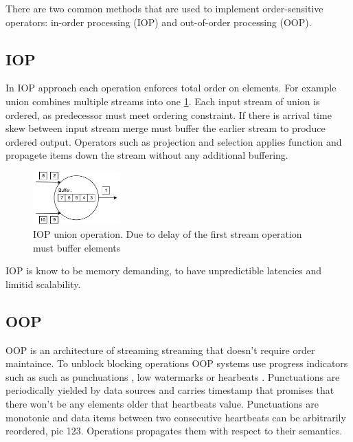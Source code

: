 
\label {fs-typical}

There are two common methods that are used to implement order-sensitive operators: in-order processing (IOP) \cite{Arasu:2006:CCQ:1146461.1146463} \cite{Cranor:2003:GSD:872757.872838} \cite{hammad2004optimizing} and out-of-order processing (OOP)\cite{Li:2008:OPN:1453856.1453890}.

\subsection{IOP}

In IOP approach each operation enforces total order on elements. For example union combines multiple streams into one \ref{iop}. Each input stream of union is ordered, as predecessor must meet ordering constraint. If there is arrival time skew between input stream merge must buffer the earlier stream to produce ordered output. Operators such as projection and selection applies function and propagete items down the stream without any additional buffering.

\begin{figure}[htbp]
  \centering
  \includegraphics[width=0.30\textwidth]{pics/iop}
  \caption{IOP union operation. Due to delay of the first stream operation must buffer elements}
  \label {iop}
\end{figure}

IOP is know to be memory demanding, to have unpredictible latencies and limitid scalability.\cite{Li:2008:OPN:1453856.1453890}

\subsection{OOP}

OOP is an architecture of streaming streaming that doesn't require order maintaince. To unblock blocking operations OOP systems use progress indicators such as such as punchuations \cite{Tucker:2003:EPS:776752.776780}, low watermarks \cite{Akidau:2013:MFS:2536222.2536229} or hearbeats \cite{Srivastava:2004:FTM:1055558.1055596}. Punctuations are periodically yielded by data sources and carries timestamp that promises that there won't be any elements older that heartbeats value. Punctuations are monotonic and data items between two consecutive heartbeats can be arbitrarily reordered, pic 123. Operations propagates them with respect to their semantics.

